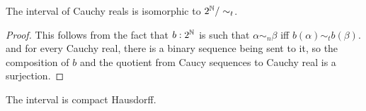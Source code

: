 








\begin{theorem}
  The interval of Cauchy reals is isomorphic to $2^{\mathbb{N}} / \sim_t$. 
\end{theorem} 
\begin{proof}
  This follows from the fact that $b:2^{\mathbb{N}}$ is such that $\alpha\sim_n \beta$ iff $b(\alpha)\sim_t b(\beta)$. 
  and for every Cauchy real, there is a binary sequence being sent to it, so the composition of $b$ and the 
  quotient from Caucy sequences to Cauchy real is a surjection. 
\end{proof}

\begin{corollary}
  The interval is compact Hausdorff. 
\end{corollary}
